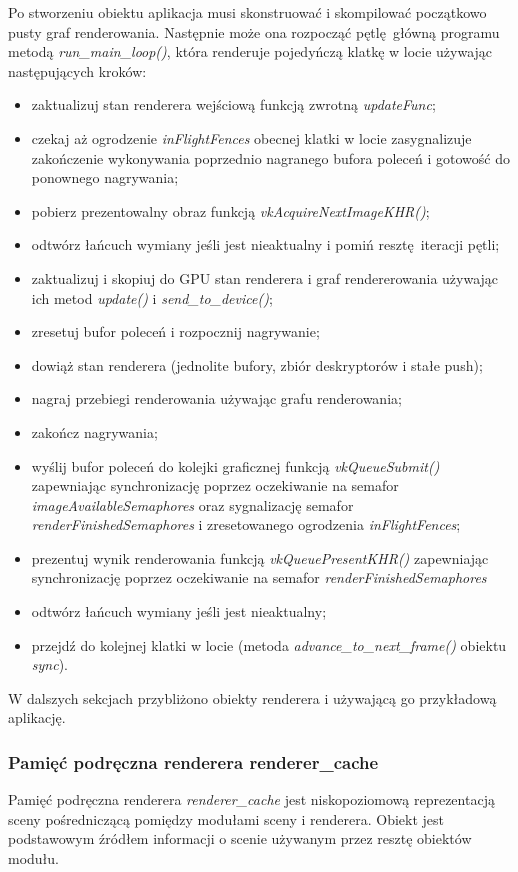 Po stworzeniu obiektu aplikacja musi skonstruować i skompilować początkowo pusty graf renderowania.
Następnie może ona rozpocząć pętlę główną programu metodą \textit{run\_main\_loop()}, która renderuje pojedyńczą klatkę w locie używając następujących kroków:
\begin{itemize}
	\item zaktualizuj stan renderera wejściową funkcją zwrotną \textit{updateFunc};
	\item czekaj aż ogrodzenie \textit{inFlightFences} obecnej klatki w locie zasygnalizuje zakończenie wykonywania poprzednio nagranego bufora poleceń i gotowość do ponownego nagrywania;
	\item pobierz prezentowalny obraz funkcją \textit{vkAcquireNextImageKHR()};
	\item odtwórz łańcuch wymiany jeśli jest nieaktualny i pomiń resztę iteracji pętli;
	\item zaktualizuj i skopiuj do GPU stan renderera i graf rendererowania używając ich metod \textit{update()} i \textit{send\_to\_device()};
	\item zresetuj bufor poleceń i rozpocznij nagrywanie;
	\item dowiąż stan renderera (jednolite bufory, zbiór deskryptorów i stałe push);
	\item nagraj przebiegi renderowania używając grafu renderowania;
	\item zakończ nagrywania;
	\item wyślij bufor poleceń do kolejki graficznej funkcją \textit{vkQueueSubmit()} zapewniając synchronizację poprzez oczekiwanie na semafor \textit{imageAvailableSemaphores} oraz sygnalizację semafor \textit{renderFinishedSemaphores} i zresetowanego ogrodzenia \textit{inFlightFences};
	\item prezentuj wynik renderowania funkcją \textit{vkQueuePresentKHR()} zapewniając synchronizację poprzez oczekiwanie na semafor \textit{renderFinishedSemaphores}
	\item odtwórz łańcuch wymiany jeśli jest nieaktualny;
	\item przejdź do kolejnej klatki w locie (metoda \textit{advance\_to\_next\_frame()} obiektu \textit{sync}).
\end{itemize}

W dalszych sekcjach przybliżono obiekty renderera i używającą go przykładową aplikację.


\subsubsection{Pamięć podręczna renderera renderer\_cache}
Pamięć podręczna renderera \textit{renderer\_cache} jest niskopoziomową reprezentacją sceny pośredniczącą pomiędzy modułami sceny i renderera.
Obiekt jest podstawowym źródłem informacji o scenie używanym przez resztę obiektów modułu.

